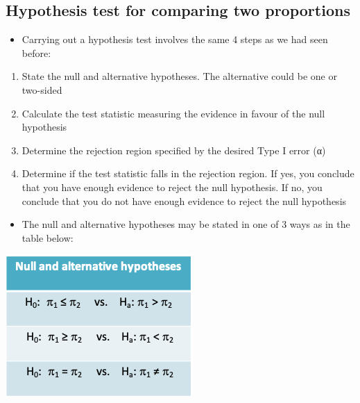 \documentclass[
]{book}
\providecommand{\tightlist}{%
  \setlength{\itemsep}{0pt}\setlength{\parskip}{0pt}}
\begin{document}
\hypertarget{hypothesis-test-for-comparing-two-proportions}{%
\subsection{Hypothesis test for comparing two proportions}\label{hypothesis-test-for-comparing-two-proportions}}

\begin{itemize}
\tightlist
\item
  Carrying out a hypothesis test involves the same 4 steps as we had seen before:
\end{itemize}

\begin{enumerate}
\def\labelenumi{\arabic{enumi}.}
\item
  State the null and alternative hypotheses. The alternative could be one or two-sided
\item
  Calculate the test statistic measuring the evidence in favour of the null hypothesis
\item
  Determine the rejection region specified by the desired Type I error (α)
\item
  Determine if the test statistic falls in the rejection region. If yes, you conclude that you have enough evidence to reject the null hypothesis. If no, you conclude that you do not have enough evidence to reject the null hypothesis
\end{enumerate}

\begin{itemize}
\tightlist
\item
  The null and alternative hypotheses may be stated in one of 3 ways as in the table below:
\end{itemize}

\includegraphics[width=0.5\linewidth]{./7_46}
\end{document}
